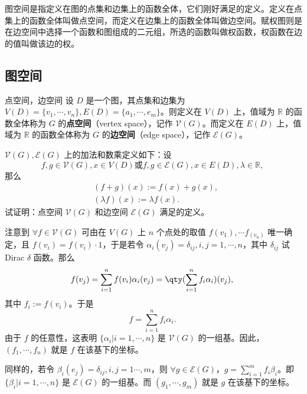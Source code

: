 
图空间是指定义在图的点集和边集上的函数全体，它们刚好满足的定义。定义在点集上的函数全体叫做点空间，而定义在边集上的函数全体叫做边空间。赋权图则是在边空间中选择一个函数和图组成的二元组，所选的函数叫做权函数，权函数在边的值叫做该边的权。

\subsection{图空间}
\begin{definition}{点空间，边空间}
设 $D$ 是一个图，其点集和边集为 $V(D)=\{v_1,\cdots,v_n\},E(D)=\{a_1,\cdots,e_m\}$。则定义在 $V(D)$ 上，值域为 $\mathbb R$ 的函数全体称为 $G$ 的\textbf{点空间}（vertex space），记作 $\mathcal V(G)$。而定义在 $E(D)$ 上，值域为 $\mathbb R$ 的函数全体称为 $G$ 的\textbf{边空间}（edge space），记作 $\mathcal E(G)$。
\end{definition}


\begin{exercise}{}
 $\mathcal V(G),\mathcal E(G)$ 上的加法和数乘定义如下：设
\begin{equation}
f,g\in\mathcal V(G),x\in V(D)\text{或} f,g\in\mathcal E(G),x\in E(D),\lambda\in \mathbb R,~
\end{equation}
那么
\begin{equation}
\begin{aligned}
&(f+g)(x):=f(x)+g(x),\\
&(\lambda f)(x):=\lambda f(x).
\end{aligned}~
\end{equation}
试证明：点空间 $\mathcal V(G)$ 和边空间 $\mathcal E(G)$ 满足的定义。
\end{exercise}

注意到 $\forall f\in\mathcal V(G)$ 可由在 $V(G)$ 上 $n$ 个点处的取值 $f(v_1),\cdots f_(v_n)$ 唯一确定，且 $f(v_i)=f(v_i)\cdot 1$，于是若令 $\alpha_i(v_j)=\delta_{ij},i,j=1,\cdots,n$，其中 $\delta_{ij}$ 试Dirac $\delta$ 函数。那么
\begin{equation}
f(v_j)=\sum_{i=1}^n f(v_i)\alpha_i(v_j)=\qty(\sum_{i=1}^n f_i\alpha_i)(v_j),~
\end{equation}
其中 $f_i:=f(v_i)$。于是
\begin{equation}
f=\sum_{i=1}^n f_i\alpha_i.~
\end{equation}
由于 $f$ 的任意性，这表明 $\{\alpha_i|i=1,\cdots,n\}$ 是 $\mathcal V(G)$ 的一组基。因此，$(f_1,\cdots,f_n)$ 就是 $f$ 在该基下的坐标。

同样的，若令 $\beta_i(e_j)=\delta_{ij},i,j=1\cdots,m$，则 $\forall g\in\mathcal E(G)$，$g=\sum\limits_{i=1}^m f_i\beta_i$。即 $\{\beta_i|i=1,\cdots,n\}$ 是 $\mathcal E(G)$ 的一组基。而 $(g_1,\cdots,g_m)$ 就是 $g$ 在该基下的坐标。












